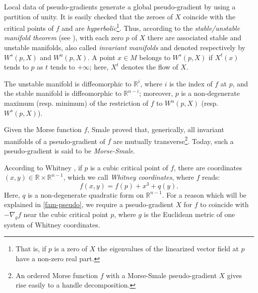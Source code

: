 \documentclass[12pt]{amsart}
\newtheorem{defn}[thm]{Definition}
\def\R{\mathbb{R}}
\begin{document}
Local data of pseudo-gradients generate a global pseudo-gradient by using a partition of unity.
It is easily checked that the zeroes of $X$ coincide with the critical points of $f$
and are {\it hyperbolic}\footnote{That is, if $p$ is a zero of $X$ the eigenvalues of the linearized vector 
field at $p$ have a non-zero real part.}. Thus, according to the {\it stable/unstable manifold theorem} 
(see \cite{brin}), with each zero $p$ of $X$
 there are  associated stable and unstable manifolds, also called {\it invariant manifolds} and 
denoted respectively  by $W^s(p,X)$ and $W^u(p,X)$. A point $x\in M$ belongs to 
$W^s(p, X)$ if $X^t(x)$ tends to $p$ as $t$ tends to $+\infty$; here, $X^t$ denotes the flow of $X$.

The unstable manifold is diffeomorphic to $\R^i$,
where $i$ is the index of $f$ at 
$p$, %
and the stable manifold is diffeomorphic to $\R^{n-i}$; moreover, 
$p$ is a non-degenerate maximum (resp. minimum) of the restriction of $f$ to $W^u(p,X)$
(resp. $W^s(p,X)$).

 Given the Morse function 
$f$,  Smale \cite{smale} proved   that, generically,  
   all  invariant manifolds of a pseudo-gradient of $f$ are mutually transverse\footnote{An ordered Morse function
$f$ with a Morse-Smale pseudo-gradient $X$ gives rise easily to a handle decomposition.}. Today, 
such a pseudo-gradient is said to be {\it Morse-Smale}.


According to Whitney \cite{whitney}, if $p$ is a cubic critical point of $f$, there are coordinates
$(x,y)\in \R\times\R^{n-1}$, which we call
{\it Whitney coordinates}, where $f$ reads:
$$f(x,y)= f(p)+ x^3+q(y).
$$
Here, $q$ is a non-degenerate quadratic form on $\R^{n-1}$. For  a reason
which will be explained in  %
 \ref{fam-pseudo}, we require a pseudo-gradient $X$ for $f$ to coincide 
with $-\nabla_gf$ near the cubic critical point $p$,
where $g$ is the Euclidean metric of one system of Whitney coordinates.
\end{document}
